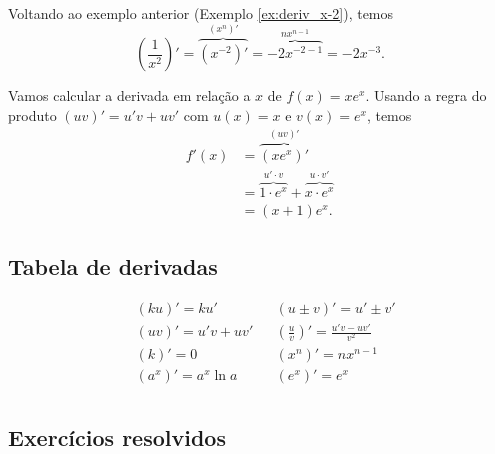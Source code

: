\begin{ex}
  Voltando ao exemplo anterior (Exemplo \ref{ex:deriv_x-2}), temos
  \begin{equation}
    \left(\frac{1}{x^2}\right)' = \overbrace{(x^{-2})'}^{(x^n)'} = \overbrace{-2x^{-2-1}}^{nx^{n-1}} = -2x^{-3}.
  \end{equation}
\end{ex}

\begin{ex}
  Vamos calcular a derivada em relação a $x$ de $f(x) = xe^x$. Usando a regra do produto $(uv)' = u'v + uv'$ com $u(x) = x$ e $v(x) = e^x$, temos
  \begin{align}
    f'(x) &= \overbrace{(xe^x)'}^{(uv)'}\\
          &= \overbrace{1\cdot e^x}^{u'\cdot v} + \overbrace{x\cdot e^x}^{u\cdot v'}\\
          &= (x + 1)e^x.
  \end{align}
\end{ex}

\subsection{Tabela de derivadas}

\begin{align}
  &(ku)' = ku' && (u\pm v)' = u' \pm v'\\
  &(uv)' = u'v + uv' && \left(\frac{u}{v}\right)' = \frac{u'v - uv'}{v^2} \\
  &(k)' = 0 && (x^n)' = nx^{n-1}\\
  &(a^x)' = a^x\ln a && (e^x)' = e^x \\
\end{align}


\subsection*{Exercícios resolvidos}

